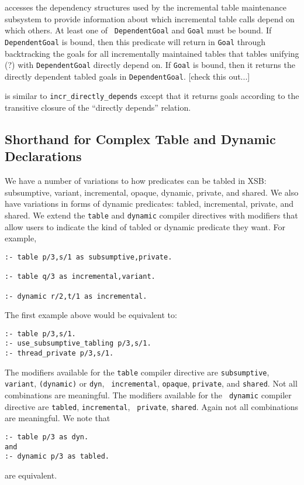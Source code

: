 \begin{description}
accesses the dependency structures used by the incremental table
maintenance subsystem to provide information about which incremental
table calls depend on which others.  At least one of {\tt
DependentGoal} and {\tt Goal} must be bound.  If {\tt DependentGoal}
is bound, then this predicate will return in {\tt Goal} through
backtracking the goals for all incrementally maintained tables that
tables unifying (?) with {\tt DependentGoal} directly depend on.  If
{\tt Goal} is bound, then it returns the directly dependent tabled
goals in {\tt DependentGoal}.  [check this out...]

is similar to {\tt incr\_directly\_depends} except that it returns
goals according to the transitive closure of the ``directly depends''
relation.
\end{description}

\subsection{Shorthand for Complex Table and Dynamic Declarations}

We have a number of variations to how predicates can be tabled in XSB:
subsumptive, variant, incremental, opaque, dynamic, private, and
shared.  We also have variations in forms of dynamic predicates:
tabled, incremental, private, and shared.  We extend the {\tt table}
and {\tt dynamic} compiler directives with modifiers that allow users
to indicate the kind of tabled or dynamic predicate they want.  For
example,
\begin{verbatim}
:- table p/3,s/1 as subsumptive,private.

:- table q/3 as incremental,variant.

:- dynamic r/2,t/1 as incremental.
\end{verbatim}

The first example above would be equivalent to:

\begin{verbatim}
:- table p/3,s/1.
:- use_subsumptive_tabling p/3,s/1.
:- thread_private p/3,s/1.

\end{verbatim}

The modifiers available for the {\tt table} compiler directive are
{\tt subsumptive}, {\tt variant}, {\tt (dynamic)} or {\tt dyn}, {\tt
incremental}, {\tt opaque}, {\tt private}, and {\tt shared}.  Not all
combinations are meaningful.  The modifiers available for the {\tt
dynamic} compiler directive are {\tt tabled}, {\tt incremental}, {\tt
private}, {\tt shared}.  Again not all combinations are meaningful.
We note that
\begin{verbatim}
:- table p/3 as dyn.
and
:- dynamic p/3 as tabled.
\end{verbatim}
are equivalent.

